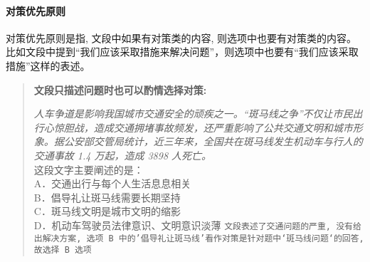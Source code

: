 \paragraph{对策优先原则}

对策优先原则是指, 文段中如果有对策类的内容, 则选项中也要有对策类的内容。比如文段中提到“我们应该采取措施来解决问题”，则选项中也要有“我们应该采取措施”这样的表述。

\begin{quote}
	\textbf{文段只描述问题时也可以酌情选择对策:}
	\begin{tcolorbox}[colback=blue!5, colframe=blue!75!black, title=对策优先原则案例]
		\textit{人车争道是影响我国城市交通安全的顽疾之一。“斑马线之争”不仅让市民出行心惊胆战，造成交通拥堵事故频发，还严重影响了公共交通文明和城市形象。据公安部交管局统计，近三年来，全国共在斑马线发生机动车与行人的交通事故 1.4 万起，造成 3898 人死亡。}\\
		这段文字主要阐述的是：\\
		A．交通出行与每个人生活息息相关\\
		B．倡导礼让斑马线需要长期坚持\\
		C．斑马线文明是城市文明的缩影\\
		D．机动车驾驶员法律意识、文明意识淡薄
		\tcblower%
		\texttt{文段表述了交通问题的严重, 没有给出解决方案, 选项 B 中的'倡导礼让斑马线'看作对策是针对题中`斑马线问题`的回答, 故选择 B 选项}
	\end{tcolorbox}
\end{quote}
